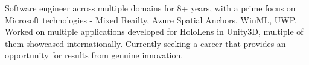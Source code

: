 \documentclass[11pt, a4paper]{awesome-cv}
\begin{document}
\makecvheader[C]


\begin{cvparagraph}

	Software engineer across multiple domains for 8+ years, with a prime focus on Microsoft technologies - Mixed Reailty, Azure Spatial Anchors, WinML, UWP. Worked on multiple applications developed for HoloLens in Unity3D, multiple of them showcased internationally. Currently seeking a career that provides an opportunity for results from genuine innovation.
\end{cvparagraph}
\end{document}
